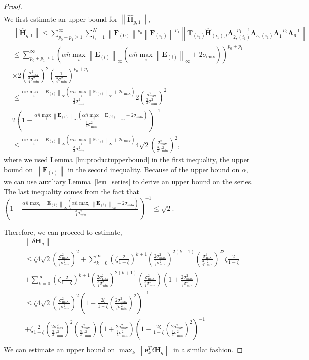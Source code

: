 \documentclass[twoside,11pt]{article}
\newcommand{\norm}[1]{\left\lVert#1\right\rVert}
\newcommand{\matE}{\mathbf{E}}
\newcommand{\matF}{\mathbf{F}}
\newcommand{\hmatH}{{\hat{\mathbf{H}}}{}}
\newcommand{\matT}{\mathbf{T}}
\newcommand{\matLambda}{\mathbf{\Lambda}}
\newcommand{\dtmatH}{\delta\mathbf{H}}
\newcommand{\vece}{\mathbf{e}}
\newcommand{\gop}{\sigma_{\max}}
\newcommand{\bn}{{\overline{n}}}
\newcommand{\abnb}{\alpha \bn\max_{i}\norm{\matE_{(i)}}_{\infty}}
\newcommand{\sms}{\sigma_{\min}^2}
\begin{document}
\begin{proof}
\begin{align*}
\end{align*}
We first estimate an upper bound for $\norm{\hmatH_{g,1}}$,
\begin{align*}
&\norm{\hmatH_{g,1}}\le \sum_{p_0+p_1\ge 1}^{\infty}\sum_{i_1=1}^N\norm{\matF_{(0)}}^{p_0}\norm{\matF_{(i_1)}}^{p_1}\norm{\matT_{(i_1)}\hmatH_{(i_1),l}\matLambda_{2,(i_1)}^{-p_1-1}\matLambda_{5,(i_1)}\matLambda_1^{-p_0}\matLambda_6^{-1} }\\
&\le \sum_{p_0+p_1\ge 1}^{\infty} \left(\abnb\left(\abnb+2\gop\right)\right)^{p_0+p_1}\\
&\times 2\left(\frac{\gop^2}{\frac{3}{4}\sms}\right)^2 \left(\frac{1}{\frac{3}{4}\sms}\right)^{p_0+p_1}\\
&\le\frac{\abnb\left(\abnb+2\gop\right)}{\frac{3}{4}\sms}2\left(\frac{\gop^2}{\frac{3}{4}\sms}\right)^2\\
&2\left(1-\frac{\abnb\left(\abnb+2\gop\right)}{\frac{3}{4}\sms}\right)^{-1}\\
&\le \frac{\abnb\left(\abnb+2\gop\right)}{\frac{3}{4}\sms}4\sqrt{2}\left(\frac{\gop^2}{\frac{3}{4}\sms}\right)^2,
\end{align*}
where we used Lemma \ref{lm:productupperbound} in the first inequality, the upper bound on $\norm{\matF_{(i)}}$ in the second inequality. Because of the upper bound on $\alpha$, we can use auxiliary Lemma~\ref{lem_series} to derive an upper bound on the series. The last inequality comes from the fact that $(1-\frac{\abnb\left(\abnb+2\gop\right)}{\frac{3}{4}\sms})^{-1}\le \sqrt{2}$.

Therefore, we can proceed to estimate,
\begin{align*}
&\norm{\dtmatH_g}\\
&\le \zeta4\sqrt{2}\left(\frac{\gop^2}{\frac{3}{4}\sms}\right)^2+\sum_{k=0}^{\infty}\left(\zeta\frac{2}{1-\zeta}\right)^{k+1}\left(\frac{2\gop^2}{\frac{3}{4}\sms}\right)^{2(k+1)}\left(\frac{\gop^2}{\frac{3}{4}\sms}\right)^22 \zeta\frac{2}{1-\zeta}\\
&+\sum_{k=0}^{\infty}\left(\zeta\frac{2}{1-\zeta}\right)^{k+1}\left(\frac{2\gop^2}{\frac{3}{4}\sms}\right)^{2(k+1)}\left(\frac{\gop^2}{\frac{3}{4}\sms}\right)\left(1+\frac{2\gop^2}{\frac{3}{4}\sms}\right) \\
&\le \zeta 4\sqrt{2}\left(\frac{\gop^2}{\frac{3}{4}\sms}\right)^2\left(1-\frac{2\zeta}{1-\zeta}\left(\frac{2\gop^2}{\frac{3}{4}\sms}\right)^2\right)^{-1}\\
&+\zeta \frac{2}{1-\zeta}\left(\frac{2\gop^2}{\frac{3}{4}\sms}\right)^{2}\left(\frac{\gop^2}{\frac{3}{4}\sms}\right)\left(1+\frac{2\gop^2}{\frac{3}{4}\sms}\right)\left(1-\frac{2\zeta}{1-\zeta}\left(\frac{2\gop^2}{\frac{3}{4}\sms}\right)^2\right)^{-1}.\\
\end{align*}
We can estimate an upper bound on $\max_k\norm{\vece_k^T\dtmatH_g}$ in a similar fashion. 


\end{proof}
\end{document}
